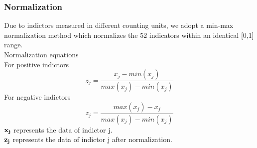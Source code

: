 \documentclass{mcmthesis}
\begin{document}
\subsubsection{Normalization}%
Due to indictors measured in different counting units, we adopt a min-max normalization method which normalizes the 52 indicators within an identical [0,1] range.\\
Normalization equations\\
For positive indictors\\
$${z}_{j}=\frac{x_{j}-min (x_j) }{max(x_j)-min(x_j)}$$
For negative indictors\\
$${z}_{j}=\frac{max (x_j) -x_{j}}{max(x_j)-min(x_j)}$$
$\bf x_j$ represents the data of indictor j.\\
$\bf z_j$ represents  the data of indictor j after normalization.\\
\end{document}
